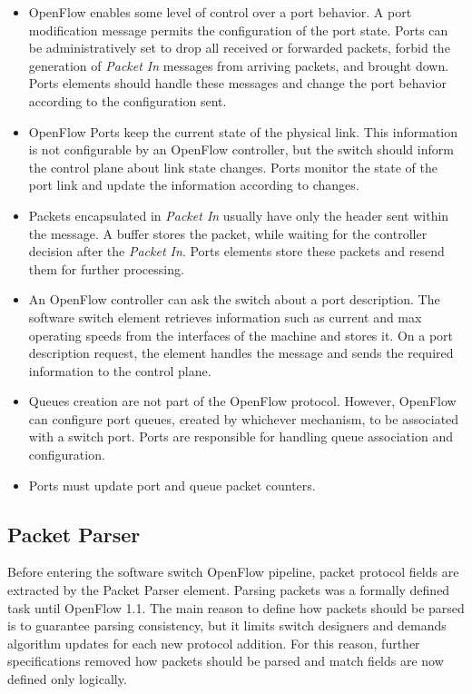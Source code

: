 	\begin{itemize}

	\item OpenFlow enables some level of control over a port behavior. A port modification message permits the configuration of the port state. Ports can be administratively set to drop all received or forwarded packets, forbid the generation of \textit{Packet In} messages from arriving packets, and brought down. Ports elements should handle these messages and change the port behavior according to the configuration sent.

	\item OpenFlow Ports keep the current state of the physical link. This information is not configurable by an OpenFlow controller, but the switch should inform the control plane about link state changes. Ports monitor the state of the port link and update the information according to changes.

	\item Packets encapsulated in \textit{Packet In} usually have only the header sent within the message. A buffer stores the packet, while waiting for the controller decision after the \textit{Packet In}. Ports elements store these packets and resend them for further processing.

	\item An OpenFlow controller can ask the switch about a port description. The software switch element retrieves information such as current and max operating speeds from the interfaces of the machine and stores it. On a port description request, the element handles the message and sends the required information to the control plane.

	\item Queues creation are not part of the OpenFlow protocol. However, OpenFlow can configure port queues, created by whichever mechanism, to be associated with a switch port. Ports are responsible for handling queue association and configuration.  

	\item Ports must update port and queue packet counters.           
	\end{itemize}

	\subsection{Packet Parser}

	Before entering the software switch OpenFlow pipeline, packet protocol fields are extracted by the Packet Parser element. Parsing packets was a formally defined task until OpenFlow 1.1. The main reason to define how packets should be parsed is to guarantee parsing consistency, but it limits switch designers and demands algorithm updates for each new protocol addition. For this reason, further specifications removed how packets should be parsed and match fields are now defined only logically.

